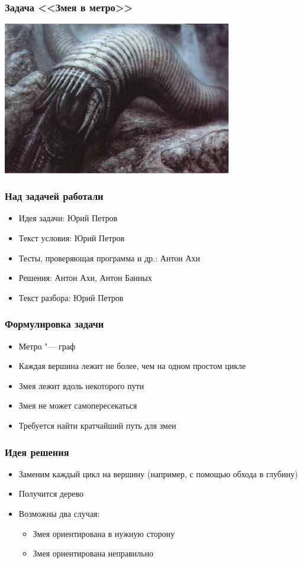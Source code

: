 \begin{frame}
  \frametitle{Задача <<Змея в метро>>}
  \begin{center}
    \includegraphics[width=10cm]{snake-11.eps}
  \end{center}
\end{frame}

\begin{frame}
  \frametitle{Над задачей работали}
  \begin{itemize}
    \item Идея задачи: Юрий Петров
    \item Текст условия: Юрий Петров
    \item Тесты, проверяющая программа и др.: Антон Ахи
    \item Решения: Антон Ахи, Антон Банных
    \item Текст разбора: Юрий Петров
  \end{itemize}
\end{frame}

\begin{frame}
  \frametitle{Формулировка задачи}
  \begin{itemize}
    \item Метро "--- граф
    \item Каждая вершина лежит не более, чем на одном простом цикле
    \item Змея лежит вдоль некоторого пути
    \item Змея не может самопересекаться
    \item Требуется найти кратчайший путь для змеи
  \end{itemize}
\end{frame}

\begin{frame}
  \frametitle{Идея решения}
  \begin{itemize}
    \item Заменим каждый цикл на вершину (например, с помощью обхода в глубину)
    \item Получится дерево
    \item Возможны два случая:
      \begin{itemize}
        \item Змея ориентирована в нужную сторону
        \item Змея ориентирована неправильно
      \end{itemize}
  \end{itemize}
\end{frame}

